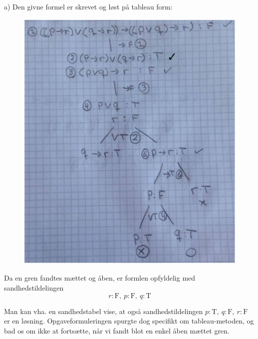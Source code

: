 
a) Den givne formel er skrevet og løst på tableau form:

\begin{figure}[H]
    \centering
    \includegraphics[height=13 cm]{OpgA/tableauAa2.pdf}
    \label{fig:Aa}
\end{figure}

Da en gren fandtes mættet og åben, er formlen opfyldelig med sandhedstildelingen
\begin{equation*}
    r:\text{F},\: p:\text{F}, \: q: \text{T}
\end{equation*}

Man kan vha. en sandhedstabel vise, at også sandhedstildelingen $p:\text{T},\: q:\text{F}, \: r: \text{F}$ er en løsning. Opgaveformuleringen spurgte dog specifikt om tableau-metoden, og bad os om ikke at fortsætte, når vi fandt blot en enkel åben mættet gren.